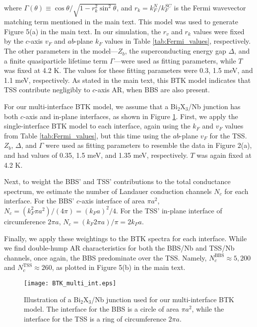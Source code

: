\documentclass[aps,prl,onecolumn,notitlepage,reprintnumbers,amsmath,amssymb,superscriptaddress,citeautoscript]{revtex4-1}
\begin{document}
where $\Gamma(\theta)\equiv\cos\theta/\sqrt{1-r_{k}^2\sin^2\theta}$, and $r_k=k^N_F / k^{SC}_F$ is the Fermi wavevector matching term mentioned in the main text. This model was used to generate Figure 5(a) in the main text. In our simulation, the $r_v$ and $r_k$ values were fixed by the $c$-axis $v_F$ and $ab$-plane $k_F$ values in Table \ref{tab:Fermi_values}, respectively. The other parameters in the model---$Z_b$, the superconducting energy gap $\Delta$, and a finite quasiparticle lifetime term $\Gamma$---were used as fitting parameters, while $T$ was fixed at 4.2 K. The values for these fitting parameters were 0.3, 1.5 meV, and 1.1 meV, respectively.  As stated in the main text, this BTK model indicates that TSS contribute negligibly to $c$-axis AR, when BBS are also present.

For our multi-interface BTK model, we assume that a Bi$_{2}$X$_{3}$/Nb junction has both $c$-axis and in-plane interfaces, as shown in Figure \ref{fig:BTK_geometries}. First, we apply the single-interface BTK model to each interface, again using the $k_F$ and $v_F$ values from Table \ref{tab:Fermi_values}, but this time using the $ab$-plane $v_F$ for the TSS. $Z_b$, $\Delta$, and $\Gamma$ were used as fitting parameters to resemble the data in Figure 2(a), and had values of 0.35, 1.5 meV, and 1.35 meV, respectively. $T$ was again fixed at 4.2 K.

Next, to weight the BBS' and TSS' contributions to the total conductance spectrum, we estimate the number of Landauer conduction channels $N_c$ for each interface. For the BBS' $c$-axis interface of area $\pi a^2$, $N_c =\left(k_{F}^{2}\pi a^2 \right)/\left(4\pi\right)= \left(k_{F} a \right)^2 /4$. For the TSS' in-plane interface of circumference $2 \pi a$, $N_c = \left(k_{F}2\pi a\right)/\pi =2 k_{F} a $.

Finally, we apply these weightings to the BTK spectra for each interface. While we find double-hump AR characteristics for both the BBS/Nb and TSS/Nb channels, once again, the BBS predominate over the TSS. Namely, $N_c^{\text{BBS}}\approx5,200$ and $N_c^{\text{TSS}}\approx260$, as plotted in Figure 5(b) in the main text.

\begin{figure}[th]
\texttt{[image: BTK\_multi\_int.eps]}
\caption{\label{fig:BTK_geometries} Illustration of a Bi$_2$X$_3$/Nb junction used for our multi-interface BTK model. The interface for the BBS is a circle of area $\pi a^2$, while the interface for the TSS is a ring of circumference $2\pi a$.}
\end{figure}


\end{document}
